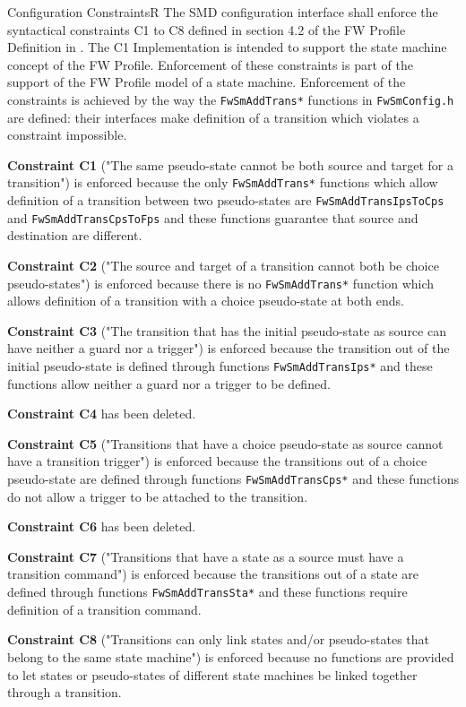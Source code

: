 \documentclass[requirements]{../fwprofile}
\begin{document}
\begin{fw_req}{Configuration Constraints}{R}
{The SMD configuration interface shall enforce the syntactical 
constraints C1 to C8 defined in section 4.2 of 
the FW Profile Definition in \cite{ref:fwprofile}.}
{The C1 Implementation is intended to support the state machine 
concept of the FW Profile. Enforcement of these 
constraints is part of the support of the FW Profile model of a  state machine.}
{ Enforcement of the constraints is achieved by the way 
the \texttt{FwSmAddTrans*} functions in 
\texttt{FwSmConfig.h} are defined: their interfaces make definition of a transition 
which violates a constraint impossible.} 
{\textbf{Constraint C1} ("The same pseudo-state cannot be both source and target for
 a transition") is enforced because the only 
\texttt{FwSmAddTrans*} functions which allow definition of a transition between two 
pseudo-states are \texttt{FwSmAddTransIpsToCps} 
and \texttt{FwSmAddTransCpsToFps} and these functions guarantee that source and destination 
are different.
\par
\textbf{Constraint C2} ("The source and target of a transition cannot both be choice 
pseudo-states") is enforced because there is no 
\texttt{FwSmAddTrans*} function which allows definition of a transition with a choice 
pseudo-state at both ends.
\par
\textbf{Constraint C3} ("The transition that has the initial pseudo-state as source 
can have neither a guard nor a trigger") is enforced 
because the transition out of the initial pseudo-state is defined through functions 
\texttt{FwSmAddTransIps*} and these functions allow neither a guard nor a trigger to be defined.
\par
\textbf{Constraint C4} has been deleted.
\par
\textbf{Constraint C5} ("Transitions that have a choice pseudo-state as source cannot have 
a transition trigger") is enforced because the 
transitions out of a choice pseudo-state are defined through functions 
\texttt{FwSmAddTransCps*} and these functions do not allow a trigger 
to be attached to the transition.
\par 
\textbf{Constraint C6} has been deleted.
\par
\textbf{Constraint C7} ("Transitions that have a state as a source must have a 
transition command") is enforced because the transitions out of 
a state are defined through functions \texttt{FwSmAddTransSta*} and these functions 
require definition of a transition command.
\par 
\textbf{Constraint C8} ("Transitions can only link states and/or pseudo-states that 
belong to the same state machine") is enforced because no 
functions are provided to let states or pseudo-states of different state machines be 
linked together through a transition.}
\end{fw_req}
\end{document}
